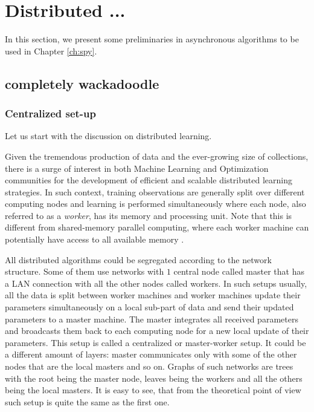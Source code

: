 \section{Distributed ...}\label{sec:basic-distributed}
In this section, we present some preliminaries in asynchronous algorithms to be used in Chapter \ref{ch:spy}.



{\color{red}
\subsection{completely wackadoodle}
\subsubsection{Centralized set-up}\label{sec:basic:distributed-centralized}

Let us start with the discussion on distributed learning.

Given the tremendous production of data and the ever-growing size of collections, there is a surge of interest in both Machine Learning and Optimization communities for the development of efficient and scalable distributed learning strategies. In such context, training observations are generally split over different computing nodes and learning is performed simultaneously where each node, also referred to as a \textit{worker}, has its memory and processing unit.  Note that this is different from shared-memory parallel computing, where each worker machine can potentially have access to all available memory \cite{Leslie91, Kumar02}. 

All distributed algorithms could be segregated according to the network structure. Some of them use networks with $1$ central node called master that has a LAN connection with all the other nodes called workers. In such setups usually, all the data is split between worker machines and worker machines update their parameters simultaneously on a local sub-part of data and send their updated parameters to a master machine. The master integrates all received parameters and broadcasts them back to each computing node for a new local update of their parameters. This setup is called a centralized or master-worker setup. It could be a different amount of layers: master communicates only with some of the other nodes that are the local masters and so on. Graphs of such networks are trees with the root being the master node, leaves being the workers and all the others being the local masters. It is easy to see, that from the theoretical point of view such setup is quite the same as the first one.

}
